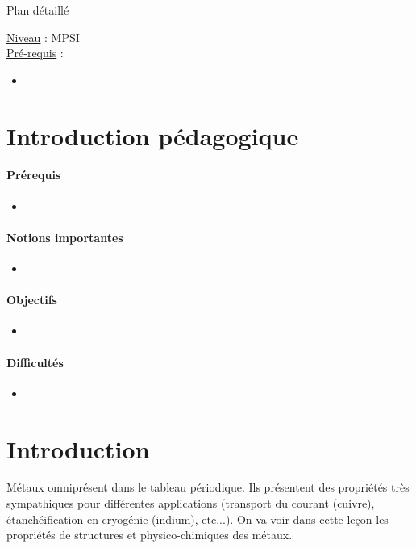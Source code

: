 \begin{reportBlock}{Plan détaillé}

\underline{Niveau} : MPSI \\

\underline{Pré-requis} :
\begin{itemize}
\item 
\end{itemize}


\section*{Introduction pédagogique}



\paragraph*{Prérequis}
\begin{itemize}
\item 
\end{itemize}

\paragraph*{Notions importantes}

\begin{itemize}
\item
\end{itemize}

\paragraph*{Objectifs}

\begin{itemize}
\item
\end{itemize}

\paragraph*{Difficultés}

\begin{itemize}
\item 
\end{itemize}

\section*{Introduction}
Métaux omniprésent dans le tableau périodique. Ils présentent des propriétés très sympathiques pour différentes applications (transport du courant (cuivre), étanchéification en cryogénie (indium), etc...). On va voir dans cette leçon les propriétés de structures et physico-chimiques des métaux.


\end{reportBlock}
